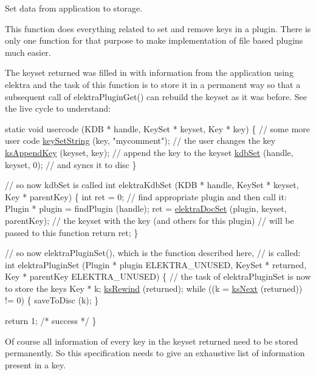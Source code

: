 Set data from application to storage. 

This function does everything related to set and remove keys in a plugin. There is only one function for that purpose to make implementation of file based plugins much easier.

The keyset {\ttfamily returned} was filled in with information from the application using elektra and the task of this function is to store it in a permanent way so that a subsequent call of elektra\+Plugin\+Get() can rebuild the keyset as it was before. See the live cycle to understand\+:


\begin{DoxyCodeInclude}
\textcolor{keyword}{static} \textcolor{keywordtype}{void} usercode (KDB * handle, KeySet * keyset, Key * key)
\{
        \textcolor{comment}{// some more user code}
        \hyperlink{group__keyvalue_ga622bde1eb0e0c4994728331326340ef2}{keySetString} (key, \textcolor{stringliteral}{"mycomment"}); \textcolor{comment}{// the user changes the key}
        \hyperlink{group__keyset_gaa5a1d467a4d71041edce68ea7748ce45}{ksAppendKey} (keyset, key);    \textcolor{comment}{// append the key to the keyset}
        \hyperlink{group__kdb_ga11436b058408f83d303ca5e996832bcf}{kdbSet} (handle, keyset, 0);        \textcolor{comment}{// and syncs it to disc}
\}

\textcolor{comment}{// so now kdbSet is called}
\textcolor{keywordtype}{int} elektraKdbSet (KDB * handle, KeySet * keyset, Key * parentKey)
\{
        \textcolor{keywordtype}{int} ret = 0;
        \textcolor{comment}{// find appropriate plugin and then call it:}
        Plugin * plugin = findPlugin (handle);
        ret = \hyperlink{group__plugin_gae65781a1deb34efc79c8cb9d9174842c}{elektraDocSet} (plugin, keyset, parentKey);
        \textcolor{comment}{// the keyset with the key (and others for this plugin)}
        \textcolor{comment}{// will be passed to this function}
        \textcolor{keywordflow}{return} ret;
\}

\textcolor{comment}{// so now elektraPluginSet(), which is the function described here,}
\textcolor{comment}{// is called:}
\textcolor{keywordtype}{int} elektraPluginSet (Plugin * plugin ELEKTRA\_UNUSED, KeySet * returned, Key * parentKey ELEKTRA\_UNUSED)
\{
        \textcolor{comment}{// the task of elektraPluginSet is now to store the keys}
        Key * k;
        \hyperlink{group__keyset_gabe793ff51f1728e3429c84a8a9086b70}{ksRewind} (returned);
        \textcolor{keywordflow}{while} ((k = \hyperlink{group__keyset_ga317321c9065b5a4b3e33fe1c399bcec9}{ksNext} (returned)) != 0)
        \{
                saveToDisc (k);
        \}

        \textcolor{keywordflow}{return} 1; \textcolor{comment}{/* success */}
\}
\end{DoxyCodeInclude}
 Of course all information of every key in the keyset {\ttfamily returned} need to be stored permanently. So this specification needs to give an exhaustive list of information present in a key.

